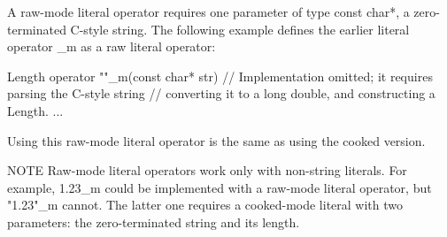 
A raw-mode literal operator requires one parameter of type const char*, a zero-terminated C-style string. The following example defines the earlier literal operator \_m as a raw literal operator:

\begin{cpp}
Length operator ""_m(const char* str)
{
    // Implementation omitted; it requires parsing the C-style string
    // converting it to a long double, and constructing a Length.
    ...
}
\end{cpp}

Using this raw-mode literal operator is the same as using the cooked version.

\begin{myNotic}{NOTE}
Raw-mode literal operators work only with non-string literals. For example, 1.23\_m could be implemented with a raw-mode literal operator, but "1.23"\_m cannot. The latter one requires a cooked-mode literal with two parameters: the zero-terminated string and its length.
\end{myNotic}














